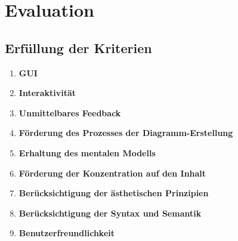 
\chapter{Evaluation}
\label{chapter:evaluation}

\section{Erfüllung der Kriterien}

\begin{enumerate}[label={K.\arabic*}]

\item
\label{eval:gui}
\textbf{GUI}

\item
\label{eval:interactivity}
\textbf{Interaktivität}

\item
\label{eval:immediate-feedback}
\textbf{Unmittelbares Feedback}

\item
\label{eval:editing-support}
\textbf{Förderung des Prozesses der Diagramm-Erstellung}

\item
\label{eval:mental-map}
\textbf{Erhaltung des mentalen Modells}

\item
\label{eval:focus-on-the-content}
\textbf{Förderung der Konzentration auf den Inhalt}

\item
\label{eval:aesthetics-criteria}
\textbf{Berücksichtigung der ästhetischen Prinzipien}

\item
\label{eval:syntax-and-semantics}
\textbf{Berücksichtigung der Syntax und Semantik}

\item
\label{eval:user-friendly}
\textbf{Benutzerfreundlichkeit}

\end{enumerate}



